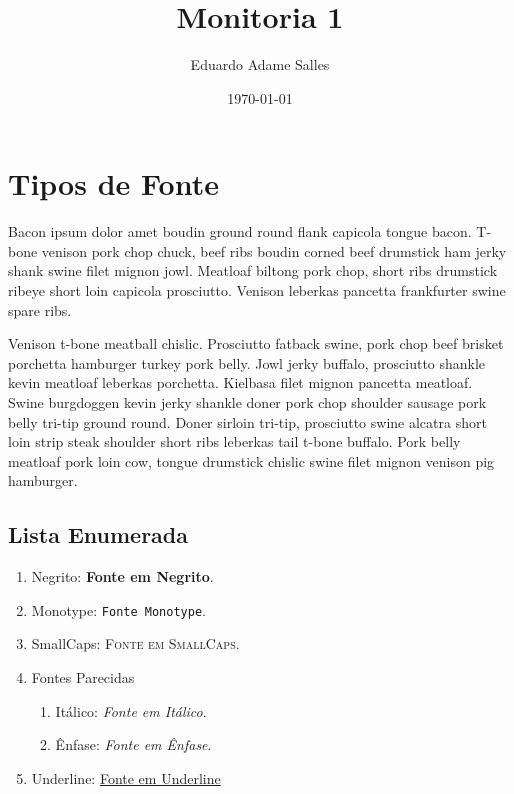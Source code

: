 \documentclass[a4paper]{article}
\title{Monitoria 1}
\author{Eduardo Adame Salles}
\date{\today}
\begin{document}
\maketitle

\newpage

\tableofcontents
\newpage

\section{Tipos de Fonte}

{\color{blue} Bacon ipsum dolor amet boudin ground round flank capicola tongue bacon. T-bone venison pork chop chuck, beef ribs boudin corned beef drumstick ham jerky shank swine filet mignon jowl. Meatloaf biltong pork chop, short ribs drumstick ribeye short loin capicola prosciutto. Venison leberkas pancetta frankfurter swine spare ribs.}

Venison t-bone meatball chislic. Prosciutto fatback swine, pork chop beef brisket porchetta hamburger turkey pork belly. Jowl jerky buffalo, prosciutto shankle kevin meatloaf leberkas porchetta. Kielbasa filet mignon pancetta meatloaf. Swine burgdoggen kevin jerky shankle doner pork chop shoulder sausage pork belly tri-tip ground round. Doner sirloin tri-tip, prosciutto swine alcatra short loin strip steak shoulder short ribs leberkas tail t-bone buffalo. Pork belly meatloaf pork loin cow, tongue drumstick chislic swine filet mignon venison pig hamburger.

\subsection{Lista Enumerada}

\begin{enumerate}
    \item Negrito: \textbf{Fonte em Negrito}.
    \item Monotype: \texttt{Fonte Monotype}.
    \item SmallCaps: \textsc{Fonte em SmallCaps}.
    \item Fontes Parecidas
    \begin{enumerate}
        \item Itálico: \textit{Fonte em Itálico}.
        \item Ênfase: \emph{Fonte em Ênfase}.
    \end{enumerate}
    \item Underline: \underline{Fonte em Underline}
\end{enumerate}
\newpage
\end{document}
